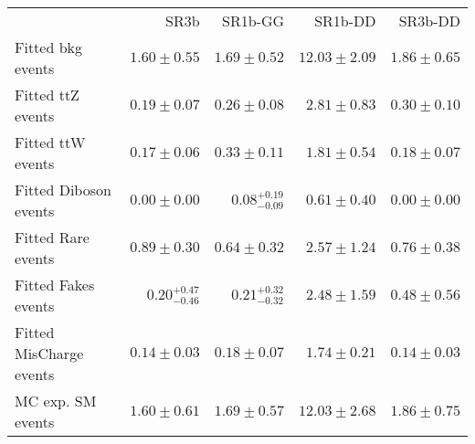 \begin{tabular*}{\textwidth}{@{\extracolsep{\fill}}lrrrr}

\noalign{\smallskip}\hline\noalign{\smallskip}

           & SR3b    & SR1b-GG   & SR1b-DD   & SR3b-DD  \\[-0.05cm]

\noalign{\smallskip}\hline\noalign{\smallskip}


Fitted bkg events         & $1.60 \pm 0.55$    & $1.69 \pm 0.52$   & $12.03 \pm 2.09$   & $1.86 \pm 0.65$  \\

\noalign{\smallskip}\hline\noalign{\smallskip}


        Fitted ttZ events         & $0.19 \pm 0.07$    & $0.26 \pm 0.08$   & $2.81 \pm 0.83$   & $0.30 \pm 0.10$  \\


        Fitted ttW events         & $0.17 \pm 0.06$    & $0.33 \pm 0.11$   & $1.81 \pm 0.54$   & $0.18 \pm 0.07$  \\


        Fitted Diboson events         & $0.00 \pm 0.00$    & $0.08_{-0.09}^{+0.19}$   & $0.61 \pm 0.40$   & $0.00 \pm 0.00$  \\


        Fitted Rare events         & $0.89 \pm 0.30$    & $0.64 \pm 0.32$   & $2.57 \pm 1.24$   & $0.76 \pm 0.38$  \\


        Fitted Fakes events         & $0.20_{-0.46}^{+0.47}$    & $0.21_{-0.32}^{+0.32}$   & $2.48 \pm 1.59$   & $0.48 \pm 0.56$  \\


        Fitted MisCharge events         & $0.14 \pm 0.03$    & $0.18 \pm 0.07$   & $1.74 \pm 0.21$   & $0.14 \pm 0.03$  \\


 \noalign{\smallskip}\hline\noalign{\smallskip}


MC exp. SM events              & $1.60 \pm 0.61$    & $1.69 \pm 0.57$   & $12.03 \pm 2.68$   & $1.86 \pm 0.75$  \\


\end{tabular*}
